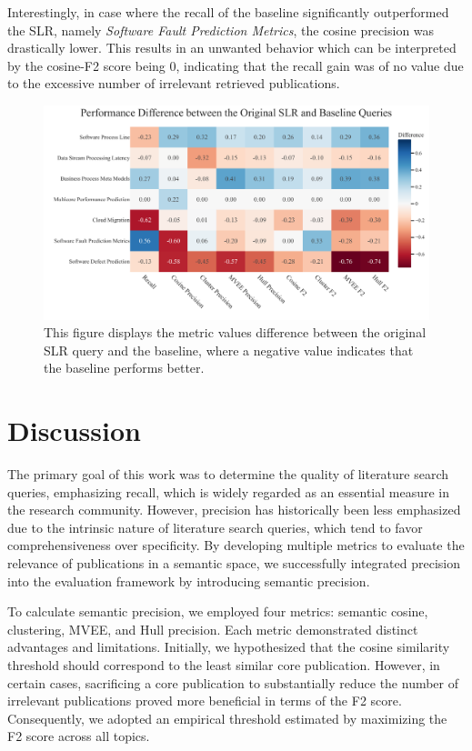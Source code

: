 Interestingly, in case where the recall of the baseline significantly outperformed the SLR, namely \textit{Software Fault Prediction Metrics}, the cosine precision was drastically lower. This results in an unwanted behavior which can be interpreted by the cosine-F2 score being 0, indicating that the recall gain was of no value due to the excessive number of irrelevant retrieved publications.


\begin{figure}	
	\centering
	\includegraphics[scale=0.45]{pics/eval2_results.pdf}
	\caption{This figure displays the metric values difference between the original SLR query and the baseline, where a negative value indicates that the baseline performs better.}
	\label{fig:eval2_results}
\end{figure}

\section{Discussion}

The primary goal of this work was to determine the quality of literature search queries, emphasizing recall, which is widely regarded as an essential measure in the research community. However, precision has historically been less emphasized due to the intrinsic nature of literature search queries, which tend to favor comprehensiveness over specificity. By developing multiple metrics to evaluate the relevance of publications in a semantic space, we successfully integrated precision into the evaluation framework by introducing semantic precision.

To calculate semantic precision, we employed four metrics: semantic cosine, clustering, MVEE, and Hull precision. Each metric demonstrated distinct advantages and limitations. Initially, we hypothesized that the cosine similarity threshold should correspond to the least similar core publication. However, in certain cases, sacrificing a core publication to substantially reduce the number of irrelevant publications proved more beneficial in terms of the F2 score. Consequently, we adopted an empirical threshold estimated by maximizing the F2 score across all topics.

